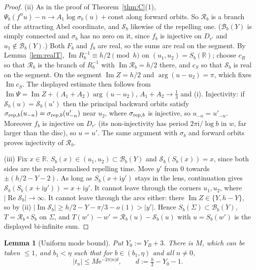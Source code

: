 \documentclass[11pt]{amsart}
\newtheorem{lemma}[theorem]{Lemma}
\theoremstyle{definition}
\newcommand{\Rr}{R}
\newcommand{\eee}{\mathrm{e}}
\newcommand{\ii}{\mathrm{i}}
\begin{document}
\begin{proof}
(ii) As in the proof of Theorem~\ref{thm:C}(1), $\Psi_b(f^nu)-n\to A_1\log\sigma_b(u)+\mathrm{const}$
along forward orbits.  So $\mathcal R_b$ is a branch of the attracting Abel
coordinate, and $\mathcal S_b$ likewise of the repelling one.  ($\mathcal B_b(Y)$
is simply connected and $\sigma_b$ has no zero on it, since $f_b$ is injective
on $D_{r'}$ and $u_1\notin\mathcal B_b(Y)$.)  Both $F_b$ and $f_b$ are real,
so the sums are real on the segment.  By Lemma~\ref{lem:realT},
$\operatorname{Im}\Rr_b^{-1}\equiv h/2\pmod h$ on $(u_1,u_2)=S_b(\mathbb R)$;
choose $c_R$ so that $\mathcal R_b$ is the branch of $\Rr_b^{-1}$ with
$\operatorname{Im}\mathcal R_b=h/2$ there, and $c_S$ so that $\mathcal S_b$
is real on the segment.  On
the segment $\operatorname{Im}Z=h/2$ and $\arg(u-u_2)=\pi$, which fixes
$\operatorname{Im}c_S$.  The displayed estimate then follows from
$\operatorname{Im}\Psi=\operatorname{Im}Z+(A_1+A_2)\arg(u-u_2)$,
$A_1+A_2\to\tfrac13$ and (i).  Injectivity: if $\mathcal S_b(u)=\mathcal S_b(u')$
then the principal backward orbits satisfy
$\sigma_{{\rm rep},b}(u_{-n})=\sigma_{{\rm rep},b}(u'_{-n})$ near $u_2$, where $\sigma_{{\rm rep},b}$ is injective, so
$u_{-n}=u'_{-n}$.  Moreover $f_b$ is injective on $D_{r'}$ (its non-injectivity
has period $2\pi\ii/\log b$ in $w$, far larger than the disc), so $u=u'$.  The
same argument with $\sigma_b$ and forward orbits proves injectivity of
$\mathcal R_b$.

(iii) Fix $x\in\mathbb R$.  $S_b(x)\in(u_1,u_2)\subset\mathcal B_b(Y)$ and
$\mathcal S_b(S_b(x))=x$, since both sides are the real-normalised repelling
time.  Move $y'$ from $0$ towards $\pm(h/2-Y-2)$.  As long as $S_b(x+\ii y')$
stays in the lens, continuation gives $\mathcal S_b(S_b(x+\ii y'))=x+\ii y'$.
It cannot leave through the corners $u_1,u_2$, where
$|\operatorname{Re}\mathcal S_b|\to\infty$.  It cannot leave through the arcs
either: there $\operatorname{Im}Z\in\{Y,h-Y\}$, so by (ii)
$|\operatorname{Im}\mathcal S_b|\ge h/2-Y-\pi/3-o(1)>|y'|$.  Hence
$S_b(\Sigma)\subset\mathcal B_b(Y)$, $T=\mathcal R_b\circ S_b$ on $\Sigma$, and
$T(w')-w'=\mathcal R_b(u)-\mathcal S_b(u)$ with $u=S_b(w')$ is the displayed
bi-infinite sum.
\end{proof}

\begin{lemma}[Uniform mode bound]\label{lem:modes}
Put $Y_0:=Y_B+3$.  There is $M$, which can be taken $\le1$, and $b_1<\eta$ such
that for $b\in(b_1,\eta)$ and all $n\ne0$,
\[
 |t_n|\le M\eee^{-2\pi|n|d},\qquad d:=\tfrac h2-Y_0-1 .
\]
\end{lemma}
\end{document}
